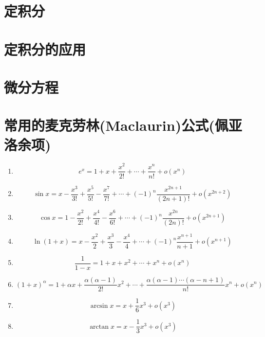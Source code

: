 \documentclass[lang=cn,10pt]{elegantbook}
\begin{document}
\chapter{定积分}




\chapter{定积分的应用}



\chapter{微分方程}







\appendix
\renewcommand{\thechapter}{\Roman{chapter}}%
\chapter{常用的麦克劳林(Maclaurin)公式(佩亚洛余项)}
\begin{enumerate}
	\item \[ e^{x} = 1 + x + \dfrac{x^{2}}{2!} + \cdots + \dfrac{x^{n}}{n!} + o(x^{n}) \]
	\item \[ \sin x = x - \dfrac{x^{3}}{3!} + \dfrac{x^{5}}{5!} - \dfrac{x^{7}}{7!} + \cdots + (-1)^{n}\dfrac{x^{2n + 1}}{(2n + 1)!} + o(x^{2n + 2}) \]
	\item \[ \cos x = 1 - \dfrac{x^{2}}{2!} + \dfrac{x^{4}}{4!} - \dfrac{x^{6}}{6!} + \cdots + (-1)^{n}\dfrac{x^{2n}}{(2n)!} + o(x^{2n + 1}) \]
	\item \[ \ln(1 + x) = x - \dfrac{x^{2}}{2} + \dfrac{x^{3}}{3} - \dfrac{x^{4}}{4} + \cdots + (-1)^{n}\dfrac{x^{n + 1}}{n + 1} + o(x^{n + 1}) \]
	\item \[ \dfrac{1}{1 - x} = 1 + x + x^{2} + \cdots +x^{n} + o(x^{n}) \]
	\item \[ (1 + x)^{\alpha} = 1 + \alpha x + \dfrac{\alpha(\alpha - 1)}{2!}x^{2} + \cdots + \dfrac{\alpha(\alpha - 1)\cdots(\alpha - n + 1)}{n!}x^{n} + o(x^{n}) \]
	\item \[ \arcsin x = x + \dfrac{1}{6}x^{3} + o(x^{3}) \]
	\item \[ \arctan x = x - \dfrac{1}{3}x^{3} + o(x^{3}) \]
\end{enumerate}
\end{document}
